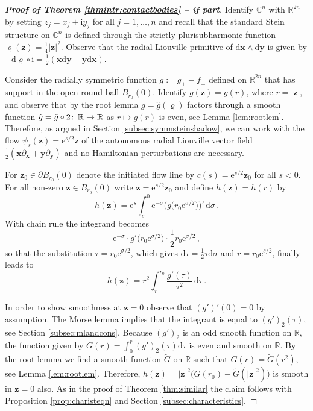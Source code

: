 \documentclass{amsart}
\theoremstyle{definition}
\def\co{\colon\thinspace}
\newcommand{\C}{\mathbb C}
\newcommand{\rmd}{\mathrm d}
\newcommand{\rme}{\mathrm e}
\newcommand{\rmi}{\mathrm i}
\newcommand{\R}{\mathbb R}
\newcommand{\bfx}{\mathbf x}
\newcommand{\bfy}{\mathbf y}
\newcommand{\bfz}{\mathbf z}
\newcommand{\ra}{\rightarrow}
\begin{document}
\begin{proof}
[{\bf Proof of Theorem \ref{thmintr:contactbodies}
-- if part}]
Identify $\C^n$ with $\R^{2n}$ by setting
$z_j=x_j+\rmi y_j$ for all $j=1,\ldots,n$ and recall
that the standard Stein structure on $\C^n$
is defined through the strictly plurisubharmonic function
$\varrho(\bfz)=\tfrac14|\bfz|^2$.
Observe that the radial Liouville primitive of $\rmd\bfx\wedge\rmd\bfy$
is given by
$-\rmd\varrho\circ\rmi=\tfrac12(\bfx\rmd\bfy-\bfy\rmd\bfx)$.

Consider the radially symmetric function
$g:=g_{\pm}-f_{\pm}$ defined on $\R^{2n}$
that has support in the open round ball
$B_{r_0}\!(0)$.
Identify $g(\bfz)=g(r)$, where $r=|\bfz|$,
and observe that by the root lemma
$g=\hat{g}(\varrho)$ factors through a smooth function
$\hat{g}=\tilde{g}\circ2\co\R\ra\R$
as $r\mapsto g(r)$ is even,
see Lemma \ref{lem:rootlem}.
Therefore,
as argued in Section \ref{subsec:symmsteinshadow},
we can work with the flow
$\psi_s(\bfz)=\rme^{s/2}\bfz$ of
the autonomous radial Liouville vector field
$\tfrac12(\bfx\partial_{\bfx}+\bfy\partial_{\bfy})$
and no Hamiltonian perturbations are necessary.

For $\bfz_0\in\partial B_{r_0}\!(0)$
denote the initiated flow line by
$c(s)=\rme^{s/2}\bfz_0$ for all $s<0$.
For all non-zero $\bfz\in  B_{r_0}\!(0)$
write $\bfz=\rme^{s/2}\bfz_0$ and define
$h(\bfz)=h(r)$ by
  \[
    h(\bfz)=
    \rme^s
        \int_s^0
          \rme^{-\sigma}
          \Big(g\big(r_0\rme^{\sigma/2}\big)\Big)'
          \,
        \rmd\sigma
        \,.
  \]
  With chain rule the integrand becomes
  \[
  \rme^{-\sigma}
  \cdot
  g'\big(r_0\rme^{\sigma/2}\big)
  \cdot
  \frac{1}{2}r_0
  \rme^{\sigma/2}
  \,,
  \]
  so that the substitution $\tau=r_0\rme^{\sigma/2}$,
  which gives $\rmd\tau=\frac12\tau\rmd\sigma$
  and $r=r_0\rme^{s/2}$, finally leads to
  \[
    h(\bfz)=
    r^2
        \int_r^{r_0}
          \frac{g'(\tau)}{\tau^2}
          \,
        \rmd\tau
        \,.
  \]
  
  In order to show smoothness at $\bfz=0$
  observe that $(g')'(0)=0$ by assumption.
  The Morse lemma implies
  that the integrant is equal to $(g')_2(\tau)$,
  see Section \ref{subsec:mlandcons}.
  Because $(g')_2$ is an odd smooth function on $\R$,
  the function given by
  $G(r)=\int_0^r(g')_2(\tau)\rmd\tau$
  is even and smooth on $\R$.
  By the root lemma we find a smooth function
  $\tilde{G}$ on $\R$
  such that $G(r)=\tilde{G}(r^2)$,
  see Lemma \ref{lem:rootlem}.
  Therefore,
  $h(\bfz)=|\bfz|^2\big(G(r_0)-\tilde{G}(|\bfz|^2)\big)$
  is smooth in $\bfz=0$ also.
  As in the proof of Theorem \ref{thm:similar}
  the claim follows with 
  Proposition \ref{prop:charisteqn}
  and Section \ref{subsec:characteristics}.
\end{proof}
\end{document}
